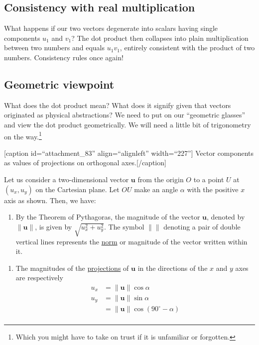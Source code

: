 \documentclass[
  a4paper,
]{article}
\providecommand{\tightlist}{%
  \setlength{\itemsep}{0pt}\setlength{\parskip}{0pt}}
\begin{document}
\hypertarget{consistency-with-real-multiplication}{%
\subsection{Consistency with real
multiplication}\label{consistency-with-real-multiplication}}

What happens if our two vectors degenerate into scalars having single
components \(u_{1}\) and \(v_{1}\)? The dot product then collapses into
plain multiplication between two numbers and equals \(u_{1}v_{1}\),
entirely consistent with the product of two numbers. Consistency rules
once again!

\hypertarget{geometric-viewpoint}{%
\subsection{Geometric viewpoint}\label{geometric-viewpoint}}

What does the dot product mean? What does it signify given that vectors
originated as physical abstractions? We need to put on our ``geometric
glasses'' and view the dot product geometrically. We will need a little
bit of trigonometry on the way.\footnote{Which you might have to take on
  trust if it is unfamiliar or forgotten.}

{[}caption id=``attachment\_83'' align=``alignleft'' width=``227''{]}
Vector components as values of projections on orthogonal
axes.{[}/caption{]}

Let us consider a two-dimensional vector \(\mathbf{u}\) from the origin
\(O\) to a point \(U\) at \((u_{x}, u_{y})\) on the Cartesian plane. Let
\(OU\) make an angle \(\alpha\) with the positive \(x\) axis as shown.
Then, we have:

\begin{enumerate}
\def\labelenumi{\arabic{enumi}.}
\tightlist
\item
  By the Theorem of Pythagoras, the magnitude of the vector
  \(\mathbf{u}\), denoted by \(\lVert\mathbf{u}\rVert\), is given by
  \(\sqrt{u_{x}^2 + u_{y}^2}\). The symbol \(\lVert\mbox{}\rVert\)
  denoting a pair of double vertical lines represents the
  \href{http://mathworld.wolfram.com/Norm.html}{norm} or magnitude of
  the vector written within it.
\end{enumerate}

\begin{enumerate}
\def\labelenumi{\arabic{enumi}.}
\setcounter{enumi}{1}
\tightlist
\item
  The magnitudes of the
  \href{http://en.wikipedia.org/wiki/Vector_projection}{projections} of
  \(\mathbf{u}\) in the directions of the \(x\) and \(y\) axes are
  respectively \[
  \begin{aligned}
  u_{x} &= \lVert\mathbf{u}\rVert\cos\alpha\\
  u_{y} &= \lVert\mathbf{u}\rVert\sin\alpha\\
  &= \lVert\mathbf{u}\rVert\cos(90^{\circ}-\alpha)\\
  \end{aligned}
  \]
\end{enumerate}
\end{document}
